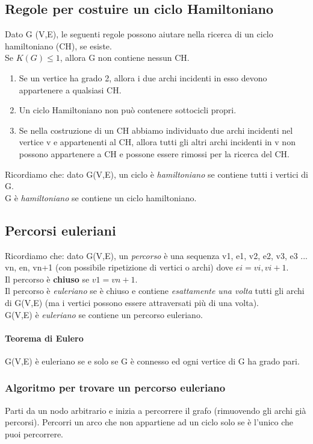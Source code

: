 \subsection{Regole per costuire un ciclo Hamiltoniano}
Dato G (V,E), le seguenti regole possono aiutare nella ricerca di un ciclo hamiltoniano (CH), se
esiste. \\
Se \( K(G) \leq 1\), allora G non contiene nessun CH.\\
\begin{enumerate}
    \item Se un vertice ha grado 2, allora i due archi incidenti in esso devono appartenere a qualsiasi CH.
    \item Un ciclo Hamiltoniano non può contenere sottocicli propri.
    \item Se nella costruzione di un CH abbiamo individuato due archi incidenti nel vertice v e
    appartenenti al CH, allora tutti gli altri archi incidenti in v non possono appartenere a CH e
    possone essere rimossi per la ricerca del CH.
\end{enumerate}
Ricordiamo che: dato G(V,E), un ciclo è \emph{hamiltoniano} se contiene
tutti i vertici di G. \\ 
G è \emph{hamiltoniano} se contiene un ciclo hamiltoniano.\\ 

\noindent
\subsection{Percorsi euleriani}
Ricordiamo che: dato G(V,E), un \emph{percorso} è una sequenza v1, e1, v2, e2, v3, e3 ... vn, en, vn+1 (con possibile
ripetizione di vertici o archi) dove \(ei=vi,vi+1\). \\ 
Il percorso è \textbf{chiuso} se \(v1=vn+1\).\\ 
Il percorso è \emph{euleriano} se è chiuso e contiene \emph{esattamente una volta} tutti gli archi di G(V,E) (ma i vertici
possono essere attraversati più di una volta). \\ 
G(V,E) è \emph{euleriano} se contiene un percorso euleriano. 
\paragraph{Teorema di Eulero} G(V,E) è euleriano se e solo se G è connesso ed ogni vertice di G ha grado pari. 
\subsubsection{Algoritmo per trovare un percorso euleriano}
Parti da un nodo
arbitrario e inizia a percorrere il grafo (rimuovendo gli archi già percorsi). Percorri un arco che non
appartiene ad un ciclo solo se è l'unico che puoi percorrere. \\





\newpage
